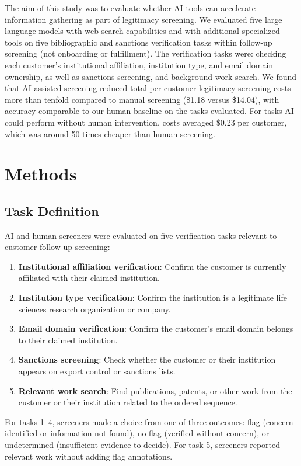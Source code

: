 \documentclass[12pt]{article}
\begin{document}
The aim of this study was to evaluate whether AI tools can accelerate information gathering as part of legitimacy screening. We evaluated five large language models with web search capabilities and with additional specialized tools on five bibliographic and sanctions verification tasks within follow-up screening (not onboarding or fulfillment). The verification tasks were: checking each customer's institutional affiliation, institution type, and email domain ownership, as well as sanctions screening, and background work search. We found that AI-assisted screening reduced total per-customer legitimacy screening costs more than tenfold compared to manual screening (\$1.18 versus \$14.04), with accuracy comparable to our human baseline on the tasks evaluated. For tasks AI could perform without human intervention, costs averaged \$0.23 per customer, which was around 50 times cheaper than human screening.

\section{Methods}

\subsection{Task Definition}

AI and human screeners were evaluated on five verification tasks relevant to customer follow-up screening:

\begin{enumerate}
\item \textbf{Institutional affiliation verification}: Confirm the customer is currently affiliated with their claimed institution.
\item \textbf{Institution type verification}: Confirm the institution is a legitimate life sciences research organization or company.
\item \textbf{Email domain verification}: Confirm the customer's email domain belongs to their claimed institution.
\item \textbf{Sanctions screening}: Check whether the customer or their institution appears on export control or sanctions lists.
\item \textbf{Relevant work search}: Find publications, patents, or other work from the customer or their institution related to the ordered sequence.
\end{enumerate}

For tasks 1--4, screeners made a choice from one of three outcomes: flag (concern identified or information not found), no flag (verified without concern), or undetermined (insufficient evidence to decide). For task 5, screeners reported relevant work without adding flag annotations.
\end{document}
